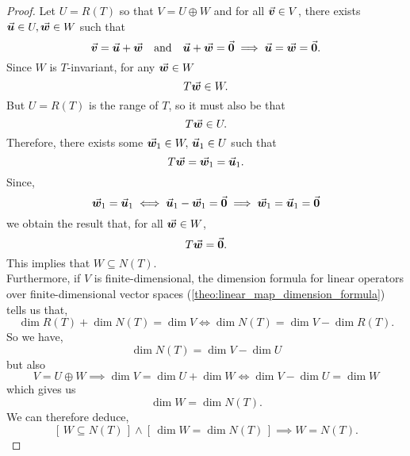 \documentclass[../MathsNotesBase.tex]{subfiles}
\begin{document}
{		\bigskip		
		\begin{proof}
			Let ${ U = R(T) }$ so that ${ V = U \oplus W }$ and for all ${ \vec{\bm{v}} \in V }$, there exists ${ \vec{\bm{u}} \in U, \vec{\bm{w}} \in W }$ such that
			\[ \vec{\bm{v}} = \vec{\bm{u}} + \vec{\bm{w}} \hspace{10pt}\text{and}\hspace{10pt} \vec{\bm{u}} + \vec{\bm{w}} = \vec{\bm{0}} \implies \vec{\bm{u}} = \vec{\bm{w}} = \vec{\bm{0}}. \]
			Since $W$ is $T$-invariant, for any ${ \vec{\bm{w}} \in W }$
			\[ T\vec{\bm{w}} \in W. \]
			But ${ U = R(T) }$ is the range of $T$, so it must also be that
			\[ T\vec{\bm{w}} \in U. \]
			Therefore, there exists some ${ \vec{\bm{w}}_1 \in W, \, \vec{\bm{u}}_1 \in U }$ such that
			\[ T\vec{\bm{w}} = \vec{\bm{w}}_1 = \vec{\bm{u}}_1. \]
			Since,
			\[ \vec{\bm{w}}_1 = \vec{\bm{u}}_1 \iff \vec{\bm{u}}_1 - \vec{\bm{w}}_1 = \vec{\bm{0}} \implies \vec{\bm{w}}_1 = \vec{\bm{u}}_1 = \vec{\bm{0}} \]
			we obtain the result that, for all ${ \vec{\bm{w}} \in W }$,
			\[ T\vec{\bm{w}} = \vec{\bm{0}}. \]
			This implies that ${ W \subseteq N(T) }$.\\
			
			Furthermore, if $V$ is finite-dimensional, the dimension formula for linear operators over finite-dimensional vector spaces (\autoref{theo:linear_map_dimension_formula}) tells us that,
			\[ \dim R(T) + \dim N(T) = \dim V \iff \dim N(T) = \dim V - \dim R(T).  \]
			So we have,
			\[ \dim N(T) = \dim V - \dim U \]
			but also
			\[ V = U \oplus W \implies \dim V = \dim U + \dim W \iff \dim V - \dim U = \dim W \]
			which gives us
			\[ \dim W = \dim N(T). \]
			We can therefore deduce,
			\[ [\, W \subseteq N(T) \,] \land [\, \dim W = \dim N(T) \,] \implies W = N(T). \]
		\end{proof}
	
		\biggerskip
		\begin{exe}
		\end{exe}
		
}
\end{document}

